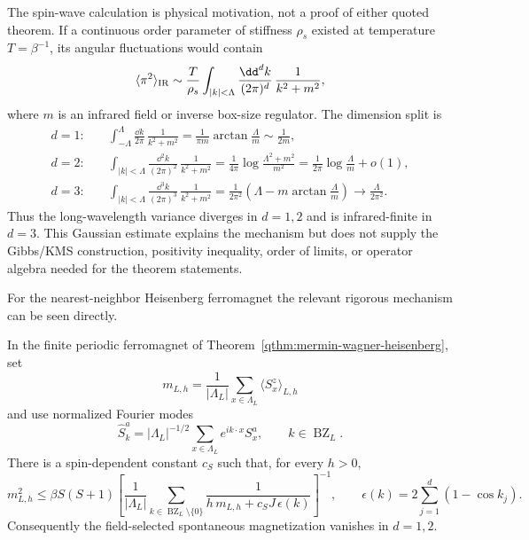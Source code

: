 The spin-wave calculation is physical motivation, not a proof of either
quoted theorem.  If a continuous order parameter of stiffness \(\rho_s\)
existed at temperature \(T=\beta^{-1}\), its angular fluctuations would contain
\begin{equation}
  \langle \pi^2\rangle_{\rm IR}
  \sim
  \frac{T}{\rho_s}
  \int_{|k|<\Lambda}
  \frac{\dd^d k}{(2\pi)^d}\,
  \frac{1}{k^2+m^2},
  \label{eq:mwh-spin-wave-integral}
\end{equation}
where \(m\) is an infrared field or inverse box-size regulator.  The
dimension split is
\begin{align}
  d=1:\quad&
  \int_{-\Lambda}^{\Lambda}
  \frac{\dd k}{2\pi}\,\frac1{k^2+m^2}
  =
  \frac{1}{\pi m}\arctan\frac{\Lambda}{m}
  \sim \frac{1}{2m},
  \nonumber\\
  d=2:\quad&
  \int_{|k|<\Lambda}
  \frac{\dd^2 k}{(2\pi)^2}\,\frac1{k^2+m^2}
  =
  \frac{1}{4\pi}\log\frac{\Lambda^2+m^2}{m^2}
  =
  \frac{1}{2\pi}\log\frac{\Lambda}{m}+o(1),
  \nonumber\\
  d=3:\quad&
  \int_{|k|<\Lambda}
  \frac{\dd^3 k}{(2\pi)^3}\,\frac1{k^2+m^2}
  =
  \frac{1}{2\pi^2}
  \left(\Lambda-m\arctan\frac{\Lambda}{m}\right)
  \longrightarrow \frac{\Lambda}{2\pi^2}.
  \label{eq:mwh-infrared-dimension-split}
\end{align}
Thus the long-wavelength variance diverges in \(d=1,2\) and is infrared-finite
in \(d=3\).  This Gaussian estimate explains the mechanism but does not supply
the Gibbs/KMS construction, positivity inequality, order of limits, or
operator algebra needed for the theorem statements.

For the nearest-neighbor Heisenberg ferromagnet the relevant rigorous
mechanism can be seen directly.

\begin{proposition}
\label{prop:heisenberg-bogoliubov-bound}
In the finite periodic ferromagnet of
Theorem~\ref{qthm:mermin-wagner-heisenberg}, set
\[
  m_{L,h}=\frac1{|\Lambda_L|}\sum_{x\in\Lambda_L}
  \langle S_x^z\rangle_{L,h}
\]
and use normalized Fourier modes
\[
  \widehat S_k^a
  =
  |\Lambda_L|^{-1/2}
  \sum_{x\in\Lambda_L}e^{ik\cdot x}S_x^a,
  \qquad
  k\in\operatorname{BZ}_L .
\]
There is a spin-dependent constant \(c_S\) such that, for every \(h>0\),
\begin{equation}
  m_{L,h}^2
  \le
  \beta S(S+1)
  \left[
    \frac1{|\Lambda_L|}
    \sum_{k\in\operatorname{BZ}_L\setminus\{0\}}
    \frac{1}{h\,m_{L,h}+c_SJ\,\epsilon(k)}
  \right]^{-1},
  \qquad
  \epsilon(k)=2\sum_{j=1}^d(1-\cos k_j).
  \label{eq:heisenberg-bogoliubov-finite-volume-bound}
\end{equation}
Consequently the field-selected spontaneous magnetization vanishes in
\(d=1,2\).
\end{proposition}

